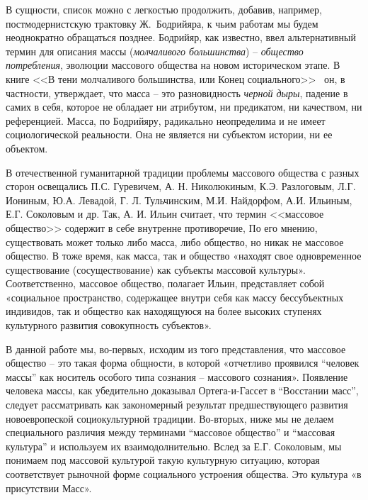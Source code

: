 В сущности, список можно с легкостью продолжить, добавив, например, постмодернистскую
трактовку Ж.~Бодрийяра, к чьим работам мы будем неоднократно обращаться позднее.
Бодрийяр, как известно, ввел альтернативный термин для описания массы (\emph{молчаливого большинства}) --
\emph{общество потребления}, эволюции массового общества на новом историческом этапе.
В книге <<В тени молчаливого большинства, или Конец социального>>~\autocite{book:bodriyar} он, в частности,
утверждает, что масса -- это разновидность \emph{черной дыры}, падение в самих в
себя, которое не обладает ни атрибутом, ни предикатом, ни качеством, ни референцией.
Масса, по Бодрийяру, радикально неопределима и не имеет социологической реальности.
Она не является ни субъектом истории, ни ее объектом.

В отечественной гуманитарной традиции проблемы массового общества с разных сторон освещались П.С. Гуревичем, А. Н. Николюкиным, К.Э. Разлоговым, Л.Г. Иониным, Ю.А. Левадой, Г. Л. Тульчинским, М.И. Найдорфом, А.И. Ильиным, Е.Г. Соколовым и др. Так, А. И. Ильин считает, что термин <<массовое общество>> содержит в себе внутренне противоречие, По его мнению, существовать может только либо масса, либо общество, но никак не массовое общество. В тоже время, как масса, так и общество «находят свое одновременное существование (сосуществование) как субъекты массовой культуры»\autocite[][79]{ilin2010}. Соответственно, массовое общество, полагает Ильин, представляет собой «социальное пространство, содержащее внутри себя как массу бессубъектных индивидов, так и общество как находящуюся на более высоких ступенях культурного развития совокупность субъектов»\autocite[][79]{ilin2010}.

В данной работе мы, во-первых, исходим из того представления, что массовое общество – это такая форма общности, в которой «отчетливо проявился “человек массы” как носитель особого типа сознания – массового сознания»\autocite[][289]{kagan2007}. Появление человека массы, как убедительно доказывал Ортега-и-Гассет в “Восстании масс”, следует рассматривать как закономерный результат предшествующего развития новоевропеской социокультурной традиции. Во-вторых, ниже мы не делаем специального различия между терминами “массовое общество” и “массовая культура” и используем их взаимодолнительно. Вслед за Е.Г. Соколовым\autocite{sokolov2002}, мы понимаем под массовой культурой такую культурную ситуацию, которая соответствует рыночной форме социального устроения общества. Это культура «в присутствии Масс»\autocites[20]{edoshina2000}[][289]{kagan2007}.

